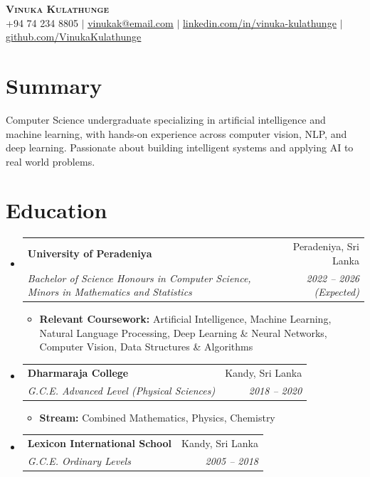 \documentclass[letterpaper,11pt]{article}
\makeatletter
\newcommand{\resumeItem}[1]{
  \item\normalsize{
    {#1 \vspace{-2pt}}
  }
}
\newcommand{\resumeSubheading}[4]{
  \vspace{-2pt}\item
    \begin{tabular*}{0.97\textwidth}[t]{l@{\extracolsep{\fill}}r}
      \textbf{#1} & #2 \\
      \textit{\small#3} & \textit{\small #4} \\
    \end{tabular*}\vspace{-7pt}
}
\newcommand{\resumeSubHeadingListStart}{\begin{itemize}[leftmargin=0.15in, label={}]}
\newcommand{\resumeSubHeadingListEnd}{\end{itemize}}
\newcommand{\resumeItemListStart}{\begin{itemize}}
\newcommand{\resumeItemListEnd}{\end{itemize}\vspace{-5pt}}
\makeatother
\begin{document}
\begin{center}
    \textbf{\Huge \scshape Vinuka Kulathunge} \\ \vspace{1pt}
    \small +94 74 234 8805 $|$ \href{mailto:x@x.com}{\underline{vinukak@email.com}} $|$
    \href{https://www.linkedin.com/in/vinuka-kulathunge-937b0421a/}{\underline{linkedin.com/in/vinuka-kulathunge}} $|$
    \href{https://github.com/VinukaKulathunge}{\underline{github.com/VinukaKulathunge}}
\end{center}

\section{Summary}
Computer Science undergraduate specializing in artificial intelligence and machine learning, with hands-on experience across computer vision, NLP, and deep learning. Passionate about building intelligent systems and applying AI to real world problems.

\section{Education}
  \resumeSubHeadingListStart
    \resumeSubheading
      {University of Peradeniya}{Peradeniya, Sri Lanka}
      {Bachelor of Science Honours in Computer Science, Minors in Mathematics and Statistics}{2022 -- 2026 (Expected)}
      \resumeItemListStart
        \resumeItem{\textbf{Relevant Coursework:} Artificial Intelligence, Machine Learning, Natural Language Processing, Deep Learning \& Neural Networks, Computer Vision, Data Structures \& Algorithms}
      \resumeItemListEnd
    
    \resumeSubheading
      {Dharmaraja College}{Kandy, Sri Lanka}
      {G.C.E. Advanced Level (Physical Sciences)}{2018 -- 2020}
      \resumeItemListStart
        \resumeItem{\textbf{Stream:} Combined Mathematics, Physics, Chemistry}
      \resumeItemListEnd
    
    \resumeSubheading
      {Lexicon International School}{Kandy, Sri Lanka}
      {G.C.E. Ordinary Levels}{2005 -- 2018}
      \resumeItemListStart
        
      \resumeItemListEnd
  \resumeSubHeadingListEnd

\end{document}
